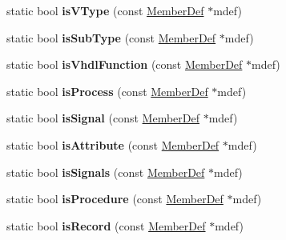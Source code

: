 \begin{DoxyCompactItemize}
\item 
\hypertarget{class_vhdl_doc_gen_ad4f6a245cdab5754c5c48174d3d63797}{static bool {\bfseries is\-V\-Type} (const \hyperlink{class_member_def}{Member\-Def} $\ast$mdef)}\label{class_vhdl_doc_gen_ad4f6a245cdab5754c5c48174d3d63797}

\item 
\hypertarget{class_vhdl_doc_gen_a488a825b00bc8b3691675f281acc7b5b}{static bool {\bfseries is\-Sub\-Type} (const \hyperlink{class_member_def}{Member\-Def} $\ast$mdef)}\label{class_vhdl_doc_gen_a488a825b00bc8b3691675f281acc7b5b}

\item 
\hypertarget{class_vhdl_doc_gen_a4076a14e6c04dc65546e5f650c6f7b71}{static bool {\bfseries is\-Vhdl\-Function} (const \hyperlink{class_member_def}{Member\-Def} $\ast$mdef)}\label{class_vhdl_doc_gen_a4076a14e6c04dc65546e5f650c6f7b71}

\item 
\hypertarget{class_vhdl_doc_gen_a33e05c29f5fe9ce5c836265372556952}{static bool {\bfseries is\-Process} (const \hyperlink{class_member_def}{Member\-Def} $\ast$mdef)}\label{class_vhdl_doc_gen_a33e05c29f5fe9ce5c836265372556952}

\item 
\hypertarget{class_vhdl_doc_gen_ab6c6dec3012ed968a2adf41591794cb1}{static bool {\bfseries is\-Signal} (const \hyperlink{class_member_def}{Member\-Def} $\ast$mdef)}\label{class_vhdl_doc_gen_ab6c6dec3012ed968a2adf41591794cb1}

\item 
\hypertarget{class_vhdl_doc_gen_a8150ef4491e53ca6da9fca5534ebaa99}{static bool {\bfseries is\-Attribute} (const \hyperlink{class_member_def}{Member\-Def} $\ast$mdef)}\label{class_vhdl_doc_gen_a8150ef4491e53ca6da9fca5534ebaa99}

\item 
\hypertarget{class_vhdl_doc_gen_a22e8e5e8342613d0663393db935c0937}{static bool {\bfseries is\-Signals} (const \hyperlink{class_member_def}{Member\-Def} $\ast$mdef)}\label{class_vhdl_doc_gen_a22e8e5e8342613d0663393db935c0937}

\item 
\hypertarget{class_vhdl_doc_gen_ac8a68606e77287c3ba475e5062974ba9}{static bool {\bfseries is\-Procedure} (const \hyperlink{class_member_def}{Member\-Def} $\ast$mdef)}\label{class_vhdl_doc_gen_ac8a68606e77287c3ba475e5062974ba9}

\item 
\hypertarget{class_vhdl_doc_gen_a790ecf0f539a209dd302b371f756e715}{static bool {\bfseries is\-Record} (const \hyperlink{class_member_def}{Member\-Def} $\ast$mdef)}\label{class_vhdl_doc_gen_a790ecf0f539a209dd302b371f756e715}


\end{DoxyCompactItemize}
